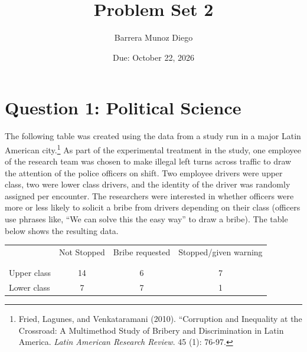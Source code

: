 \documentclass[12pt,letterpaper]{article}
\title{Problem Set 2}
\date{Due: October 22, 2026}
\author{Barrera Munoz Diego}
\begin{document}
	\maketitle
	\tableofcontents
	\newpage
	
	\section{Question 1: Political Science}
	
	The following table was created using the data from a study run in a major Latin American city.\footnote{Fried, Lagunes, and Venkataramani (2010). ``Corruption and Inequality at the Crossroad: A Multimethod Study of Bribery and Discrimination in Latin America. \textit{Latin American Research Review}. 45 (1): 76-97.} As part of the experimental treatment in the study, one employee of the research team was chosen to make illegal left turns across traffic to draw the attention of the police officers on shift. Two employee drivers were upper class, two were lower class drivers, and the identity of the driver was randomly assigned per encounter. The researchers were interested in whether officers were more or less likely to solicit a bribe from drivers depending on their class (officers use phrases like, ``We can solve this the easy way'' to draw a bribe). The table below shows the resulting data.
	
	\begin{table}[h!]
		\centering
		\begin{tabular}{l | c c c }
			& Not Stopped & Bribe requested & Stopped/given warning \\
			\\[-1.8ex] 
			\hline \\[-1.8ex]
			Upper class & 14 & 6 & 7 \\
			Lower class & 7 & 7 & 1 \\
			\hline
		\end{tabular}
	\end{table}
	
\end{document}
